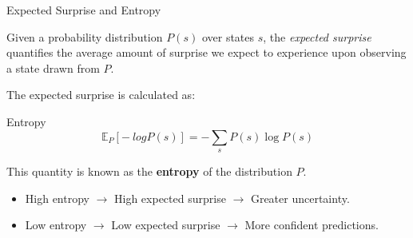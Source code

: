 \documentclass[aspectratio=1610, english]{beamer}
\begin{document}
\begin{frame}{Expected Surprise and Entropy}

Given a probability distribution $P(s)$ over states $s$, the \emph{expected surprise} quantifies the average amount of surprise we expect to experience upon observing a state drawn from $P$.

The expected surprise is calculated as:

\begin{block}{Entropy}
    \begin{equation}
        \mathbb{E}_{P}[-\   log P(s)] = - \sum_{s} P(s) \log P(s)
    \end{equation}
\end{block}

This quantity is known as the \textbf{entropy} of the distribution $P$.

\vspace{0.3cm}

\begin{itemize}
    \item High entropy $\rightarrow$ High expected surprise $\rightarrow$ Greater uncertainty.
    \item Low entropy $\rightarrow$ Low expected surprise $\rightarrow$ More confident predictions.
\end{itemize}
\end{frame}
\end{document}
